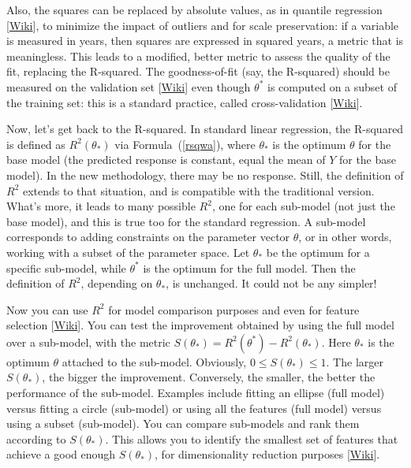 \documentclass[oneside,10pt]{book}
\begin{document}
Also, the squares 
 can be replaced by absolute values, as in \textcolor{index}{quantile regression} [\href{https://en.wikipedia.org/wiki/Quantile_regression}{Wiki}], to minimize the impact of outliers and for scale preservation: if a variable is measured in years, then squares are expressed in squared years, a metric that is meaningless. This leads to a modified, better metric to assess the quality of the fit, replacing the R-squared.  
The \textcolor{index}{goodness-of-fit} (say, the R-squared) should be measured on the \textcolor{index}{validation set}
 [\href{https://en.wikipedia.org/wiki/Training,_validation,_and_test_data_sets}{Wiki}] even though $\theta^*$ is computed on a subset of the \textcolor{index}{training set}: this is a standard practice, called \textcolor{index}{cross-validation} [\href{https://en.wikipedia.org/wiki/Cross-validation_(statistics)}{Wiki}].

Now, let's get back to the 
\textcolor{index}{R-squared}. In standard linear regression, the R-squared is defined as $R^2(\theta_*)$ via 
 Formula~(\ref{rsqwa}), where 
 $\theta_*$ is the optimum $\theta$ for the base model (the predicted response is constant, equal the mean of $Y$ for the base model). In the
 new methodology, there may be no response. Still, the definition of $R^2$ extends to that situation, and is compatible with the traditional version.
 What's more, it leads to many possible $R^2$, one for each sub-model (not just the base model), and this is true too for the standard regression. 
A sub-model corresponds to adding constraints on the parameter vector $\theta$, or in other words, working with a subset of the parameter space. Let $\theta_*$ be the optimum for a specific sub-model, while $\theta^*$ is the optimum for the full model. Then the definition of $R^2$, depending on $\theta_*$, is unchanged. It could not be any simpler! 

Now you can use $R^2$ for model comparison purposes and even for \textcolor{index}{feature selection} [\href{https://en.wikipedia.org/wiki/Feature_selection}{Wiki}]. You can test the improvement obtained by using the full model over a sub-model,  
 with the metric $S(\theta_*)= R^2(\theta^*)-R^2(\theta_*)$. Here $\theta_*$ is the optimum $\theta$ attached to the sub-model. Obviously, $0\leq S(\theta_*)\leq 1$. The larger $S(\theta_*)$, the bigger the improvement. Conversely, the smaller, the better the performance of the sub-model. Examples include fitting an ellipse (full model) versus fitting a circle (sub-model) or using all the features (full model) versus using a subset (sub-model). 
You can compare sub-models and rank them according to $S(\theta_*)$. This allows you to identify the smallest set of features that achieve a good
 enough $S(\theta_*)$, for 
\textcolor{index}{dimensionality reduction}
 purposes [\href{https://en.wikipedia.org/wiki/Dimensionality_reduction}{Wiki}]. 
\end{document}
